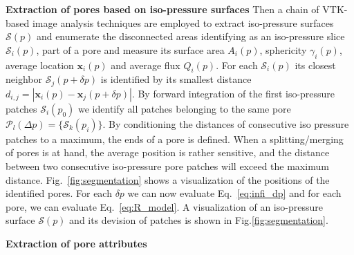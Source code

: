 \documentclass[draft,jgrga]{agutexSI2019}
\begin{document}
\begin{article}
\noindent\textbf{Extraction of pores based on iso-pressure surfaces}
Then a chain of VTK-based image analysis techniques  are employed to extract iso-pressure surfaces $\mathcal{S}(p)$ and enumerate the disconnected areas identifying as an iso-pressure slice $\mathcal{S}_i(p)$, part of a pore and measure its surface area $A_i(p)$, sphericity $\gamma_i(p)$, average location $\mathbf{x}_i(p)$ and average flux $Q_i(p)$. For each $\mathcal{S}_i(p)$ its closest neighbor $\mathcal{S}_j(p+\delta p)$ is identified by its smallest distance $d_{i,j}= \left|  \mathbf{x}_i(p)-\mathbf{x}_j(p+\delta p)\right|$. By forward integration of the first iso-pressure patches $\mathcal{S}_i(p_0)$ we identify all patches belonging to the same pore $\mathcal{P}_l(\Delta p) = \{\mathcal{S}_k(p_i)\}$. By conditioning the distances of consecutive iso pressure patches to a maximum, the ends of a pore is defined. When a splitting/merging of pores is at hand, the average position is rather sensitive, and the distance between two consecutive iso-pressure pore patches will exceed the maximum distance. Fig.~\ref{fig:segmentation} shows a visualization of the positions of the identified pores. For each $\delta p$ we can now evaluate Eq.~\ref{eq:infi_dp} and for each pore, we can evaluate Eq.~\ref{eq:R_model}. A visualization of an iso-pressure surface $\mathcal{S}(p)$ and its devision of patches is shown in Fig.\ref{fig:segmentation}. 

\noindent\textbf{Extraction of pore attributes}



\end{article}
\end{document}
